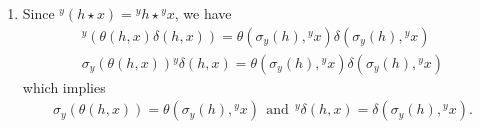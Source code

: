 \documentclass[10 pt,oneside,reqno,a4paper]{amsart}
\numberwithin{equation}{section}
\begin{document}
\begin{enumerate}
\begin{align}
~~\text{and}~~
  & {(\delta(h,x) \widetilde{\star} ~{^xy}) \delta(\theta(h,x), {^xy}) \delta({\sigma_y(h)}, x \widetilde{\star} y)^{-1}} \sigma_{\delta(h,y)^{-1}}(\delta(\theta(h,y)^{-1},x)) \notag\\& \delta([h,x], \delta(h,y)^{-1})^{-1} (\delta(h,y)^{-1}\widetilde{\star} ~x)=1.  
\end{align}
Similarly, $((h \star k) \star {^kx})((k \star x) \star {^xh})((x \star h) \star {^hk})=1$, thus we have
\begin{align}
    &(h \star k \star [k,x]) [k,x] \theta(h \star k, x) \sigma_{\delta(h \star k, x)}([k,x]^{-1} \theta(k,x) \sigma_{\delta({\sigma_x(h)},\delta(k,x))^{-1}}(\theta({\sigma_x(h)},\delta(k,x))^{-1}  \theta(k,x)^{-1} \notag\\&(\theta(k,x) \star {\sigma_x(h)}))) ~ {\sigma_{\delta(h \star k, x) \delta({\sigma_x(h)},\delta(k,x))^{-1}}({\sigma_{\delta(h,x)^{-1}}(\theta(h,x)^{-1} \star {^hk})}  ~{\sigma_{\delta({^hk}, \delta(h,x)^{-1})^{-1}}(\theta({^hk}, \delta(h,x)^{-1})^{-1}))}}=1 \notag\\
&~~\text{and}~~
    \delta(h \star k, x) \delta({\sigma_x(h)},\delta(k,x))^{-1} \delta({^hk},\delta(h,x)^{-1})^{-1}=1. 
\end{align}




\item Since $^y(h \star x)= {^yh} \star {^yx}$, we have
\begin{align*}
    ^y(\theta(h,x) \delta(h,x))= \theta({\sigma_y(h)},{^yx}) \delta({\sigma_y(h)},{^yx}) \\
    {\sigma_y(\theta(h,x))} {^y\delta(h,x)}= \theta({\sigma_y(h)},{^yx}) \delta({\sigma_y(h)},{^yx})
\end{align*}
which implies 
\begin{align}
    {\sigma_y(\theta(h,x))}=\theta({\sigma_y(h)},{^yx}) ~~\text{and}~~ {^y\delta(h,x)}= \delta({\sigma_y(h)},{^yx}).
\end{align}



\end{enumerate}
\end{document}

